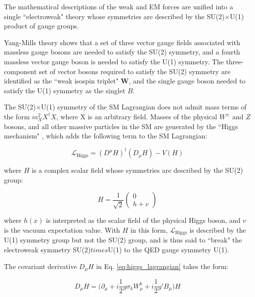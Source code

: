 The mathematical descriptions of the weak and EM forces are unified into a single ``electroweak" \cite{electroweak_2012} theory whose symmetries are described by the SU(2)\(\times\)U(1) product of gauge groups. 

Yang-Mills theory \cite{yang_mills_1954} shows that a set of three vector gauge fields associated with massless gauge bosons are needed to satisfy the SU(2) symmetry, and a fourth massless vector gauge boson is needed to satisfy the U(1) symmetry. The three-component set of vector bosons required to satisfy the SU(2) symmetry are identified as the ``weak isospin triplet" \(\boldsymbol{W}\), and the single gauge boson needed to satisfy the U(1) symmetry as the singlet \(B\). 

The SU(2)\(\times\)U(1) symmetry of the SM Lagrangian does not admit mass terms of the form \(m_X^2X^\dagger X\), where X is an arbitrary field. Masses of the physical \(W^\pm\) and \(Z\) bosons, and all other massive particles in the SM are generated by the ``Higgs mechanism" \cite{HiggsTheory1,HiggsTheory2,HiggsTheory3}, which adds the following term to the SM Lagrangian:

\begin{equation}
\label{eq:higgs_lagrangian}
\mathcal{L}_\text{Higgs} = (D^\mu H)^\dagger(D_\mu H) - V(H)
\end{equation}

\noindent where \(H\) is a complex scalar field whose symmetries are described by the SU(2) group:

\begin{equation}
H = \frac{1}{\sqrt{2}}
\begin{pmatrix}
0 \\
h+v
\end{pmatrix}
\end{equation}

\noindent where \(h(x)\) is interpreted as the scalar field of the physical Higgs boson, and \(v\) is the vacuum expectation value. With \(H\) in this form, \(\mathcal{L}_\text{Higgs}\) is described by the U(1) symmetry group but not the SU(2) group, and is thus said to ``break" the electroweak symmetry SU(2)\(times\)U(1) to the QED gauge symmetry U(1).

The covariant derivative \(D_\mu H\) in Eq. \ref{eq:higgs_lagrangian} takes the form:

\begin{equation}
\label{eq:D_muH}
D_\mu H = \big(\partial_\mu + i\frac{1}{2}g\sigma_k W^k_\mu+i\frac{1}{2}g'B_\mu\big)H
\end{equation}

